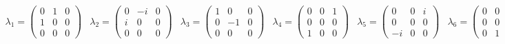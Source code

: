 \begin{subequations} \label{eq:gell_mann}

  \begin{equation} \label{eq:lambda1-3}
  \begin{array}{ccc}
    \lambda_1 = \left(
      \begin{array}{ccc}
            0 & 1 & 0 \\
            1 & 0 & 0 \\
            0 & 0 & 0
      \end{array} \right)
    &
    \lambda_2 = \left(
      \begin{array}{ccc}
            0 & -i & 0 \\
            i &  0 & 0 \\
            0 &  0 & 0
      \end{array} \right)
    &
    \lambda_3 = \left(
      \begin{array}{ccc}
             1 &  0 & 0 \\
             0 & -1 & 0 \\
             0 &  0 & 0
      \end{array} \right)
  \end{array}
  \end{equation}


  \begin{equation} \label{lamdba4-6}
  \begin{array}{ccc}
    \lambda_4 = \left(
    \begin{array}{ccc}
           0 & 0 & 1 \\
           0 & 0 & 0 \\
           1 & 0 & 0
    \end{array} \right)
    &
    \lambda_5 = \left(
    \begin{array}{ccc}
           0 & 0 & i \\
           0 & 0 & 0 \\
          -i & 0 & 0
    \end{array} \right)
    &
    \lambda_6 = \left(
    \begin{array}{ccc}
           0 & 0 & 0 \\
           0 & 0 & 1 \\
           0 & 1 & 0
    \end{array} \right)
  \end{array}
  \end{equation}



\end{subequations}
